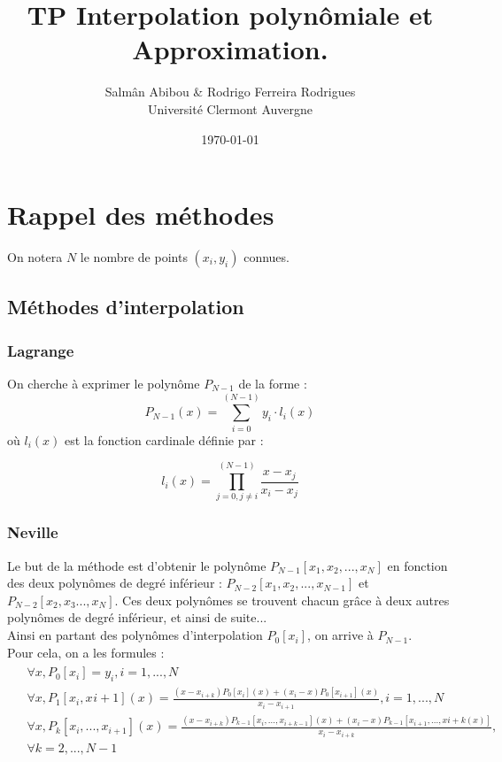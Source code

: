 \documentclass[12pt,french,titlepage]{article}
\title{TP Interpolation polynômiale et Approximation.}
\author{Salmân Abibou \& Rodrigo Ferreira Rodrigues \\
Université Clermont Auvergne\\}
\date{\today}
\begin{document}
	\maketitle


	\tableofcontents
	\newpage
	
	\section{Rappel des méthodes}
	On notera $N$ le nombre de points $(x_i,y_i)$ connues.
	\subsection{Méthodes d'interpolation}
	
	\subsubsection{Lagrange}

	On cherche à exprimer le polynôme $P_{N-1}$ de la forme :
	\begin{equation}
	P_{N-1}(x) = \sum_{i=0}^{(N-1)}y_i\cdot l_i(x)
	\end{equation}
	où $l_i(x)$ est la fonction cardinale définie par :
	
	\begin{equation}
	l_i(x) = \prod_{j=0,j\neq i}^{(N-1)}\frac{x - x_j}{x_i - x_j}
	\end{equation}
	
	\subsubsection{Neville}
	
	Le but de la méthode est d'obtenir le polynôme $P_{N-1}[x_1,x_2,... ,x_N]$ en fonction des deux polynômes de degré inférieur : $P_{N-2}[x_1,x_2,... ,x_{N-1}]$ et $P_{N-2}[x_2,x_3... ,x_{N}]$. Ces deux polynômes se trouvent chacun grâce à deux autres polynômes de degré inférieur, et ainsi de suite...\\
	Ainsi en partant des polynômes d'interpolation $P_0[x_i]$, on arrive à $P_{N-1}$.\\
	Pour cela, on a les formules :\\
	\begin{align}
		\begin{split}
	&\forall x,P_0[x_i]=y_i,i=1,...,N\\
	&\forall x,P_1[x_i,x_{}i+1](x)=\frac{(x-x_{i+k})P_{0}[x_i](x)+(x_i-x)P_{0}[x_{i+1}](x)}{x_i-x_{i+1}},i=1,...,N\\
	&\forall x,P_k[x_i,...,x_{i+1}](x)=\frac{(x-x_{i+k})P_{k-1}[x_i,...,x_{i+k-1}](x)+(x_i-x)P_{k-1}[x_{i+1},...,x{i+k}(x)]}{x_i-x_{i+k}},\\
	&\forall k=2,...,N-1
		\end{split}
	\end{align}
	
\end{document}
